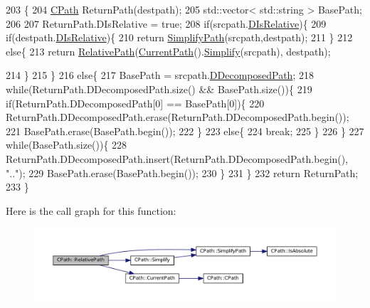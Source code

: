\begin{DoxyCode}
203                                                                     \{
204     \hyperlink{classCPath}{CPath} ReturnPath(destpath);
205     std::vector< std::string > BasePath;
206 
207     ReturnPath.DIsRelative = \textcolor{keyword}{true};
208     \textcolor{keywordflow}{if}(srcpath.\hyperlink{classCPath_af705ff149bb2281c67afb84fff550eb9}{DIsRelative})\{
209         \textcolor{keywordflow}{if}(destpath.\hyperlink{classCPath_af705ff149bb2281c67afb84fff550eb9}{DIsRelative})\{
210             \textcolor{keywordflow}{return} \hyperlink{classCPath_af0213a2ea0de0498ded236137e759922}{SimplifyPath}(srcpath,destpath);
211         \}
212         \textcolor{keywordflow}{else}\{
213             \textcolor{keywordflow}{return} \hyperlink{classCPath_a76f73670ecc0a434c2f8a1ea0f1a040e}{RelativePath}(\hyperlink{classCPath_a5161b834e754b217ddead2437eaaa223}{CurrentPath}().\hyperlink{classCPath_aa52dcb50c943a8abc8883db5ec43a45e}{Simplify}(srcpath), destpath); 
         
214         \}
215     \}
216     \textcolor{keywordflow}{else}\{
217         BasePath = srcpath.\hyperlink{classCPath_a03ed25209a01e633c107a0c877fc61f8}{DDecomposedPath};    
218         \textcolor{keywordflow}{while}(ReturnPath.DDecomposedPath.size() && BasePath.size())\{
219             \textcolor{keywordflow}{if}(ReturnPath.DDecomposedPath[0] == BasePath[0])\{
220                 ReturnPath.DDecomposedPath.erase(ReturnPath.DDecomposedPath.begin());
221                 BasePath.erase(BasePath.begin());
222             \}
223             \textcolor{keywordflow}{else}\{
224                 \textcolor{keywordflow}{break};
225             \}
226         \}
227         \textcolor{keywordflow}{while}(BasePath.size())\{
228             ReturnPath.DDecomposedPath.insert(ReturnPath.DDecomposedPath.begin(), \textcolor{stringliteral}{".."});
229             BasePath.erase(BasePath.begin());
230         \}  
231     \}
232     \textcolor{keywordflow}{return} ReturnPath;
233 \}
\end{DoxyCode}
Here is the call graph for this function\+:
\nopagebreak
\begin{figure}[H]
\begin{center}
\leavevmode
\includegraphics[width=350pt]{classCPath_a76f73670ecc0a434c2f8a1ea0f1a040e_cgraph}
\end{center}
\end{figure}
